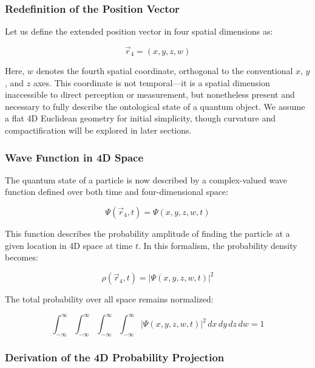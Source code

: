 \documentclass[12pt]{article}
\begin{document}
\subsubsection{Redefinition of the Position Vector}

Let us define the extended position vector in four spatial dimensions as:

\begin{equation}
    \vec{r}_4 = (x, y, z, w)
\end{equation}

Here, $w$ denotes the fourth spatial coordinate, orthogonal to the conventional $x$, $y$, and $z$ axes. This coordinate is not temporal—it is a spatial dimension inaccessible to direct perception or measurement, but nonetheless present and necessary to fully describe the ontological state of a quantum object. We assume a flat 4D Euclidean geometry for initial simplicity, though curvature and compactification will be explored in later sections.

\subsubsection{Wave Function in 4D Space}

The quantum state of a particle is now described by a complex-valued wave function defined over both time and four-dimensional space:

\begin{equation}
    \Psi(\vec{r}_4, t) = \Psi(x, y, z, w, t)
\end{equation}

This function describes the probability amplitude of finding the particle at a given location in 4D space at time $t$. In this formalism, the probability density becomes:

\begin{equation}
    \rho(\vec{r}_4, t) = |\Psi(x, y, z, w, t)|^2
\end{equation}

The total probability over all space remains normalized:

\begin{equation}
    \int_{-\infty}^{\infty} \int_{-\infty}^{\infty} \int_{-\infty}^{\infty} \int_{-\infty}^{\infty} |\Psi(x, y, z, w, t)|^2 \, dx \, dy \, dz \, dw = 1
\end{equation}

\subsubsection{Derivation of the 4D Probability Projection}
\end{document}
